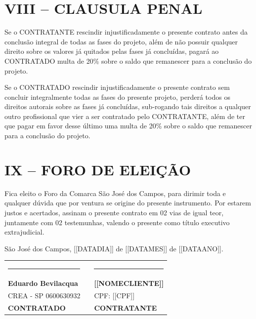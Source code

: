 \documentclass[11pt,a4paper]{article}
\begin{document}
\vspace{0.8cm}
\begin{minipage}{\textwidth}
\section*{VIII – CLAUSULA PENAL}
\noindent Se o CONTRATANTE rescindir injustificadamente o presente contrato antes da conclusão integral de todas as fases do projeto, além de não possuir qualquer direito sobre os valores já quitados pelas fases já concluídas, pagará ao CONTRATADO multa de 20\% sobre o saldo que remanescer para a conclusão do projeto.

\vspace{0.3cm}
\noindent Se o CONTRATADO rescindir injustificadamente o presente contrato sem concluir integralmente todas as fases do presente projeto, perderá todos os direitos autorais sobre as fases já concluídas, sub-rogando tais direitos a qualquer outro profissional que vier a ser contratado pelo CONTRATANTE, além de ter que pagar em favor desse último uma multa de 20\% sobre o saldo que remanescer para a conclusão do projeto.

\vspace{0.5cm}
\section*{IX – FORO DE ELEIÇÃO}
\noindent Fica eleito o Foro da Comarca São José dos Campos, para dirimir toda e qualquer dúvida que por ventura se origine do presente instrumento. Por estarem justos e acertados, assinam o presente contrato em 02 vias de igual teor, juntamente com 02 testemunhas, valendo o presente como título executivo extrajudicial.

\vspace{1.5cm}
\noindent São José dos Campos, [[DATADIA]] de [[DATAMES]] de [[DATAANO]].

\vspace{2.2cm}

\noindent
\begin{tabularx}{\textwidth}{X c X}
    \centering \rule{6cm}{0.5pt} & & \centering \rule{6cm}{0.5pt} \tabularnewline
    \centering \textbf{Eduardo Bevilacqua} & & \centering \textbf{[[NOMECLIENTE]]} \tabularnewline
    \centering CREA - SP 0600630932 & & \centering CPF: [[CPF]] \tabularnewline
    \centering \textcolor{marcaRed}{\textbf{CONTRATADO}} & & \centering \textcolor{marcaRed}{\textbf{CONTRATANTE}} \tabularnewline
\end{tabularx}
\end{minipage}
\end{document}
